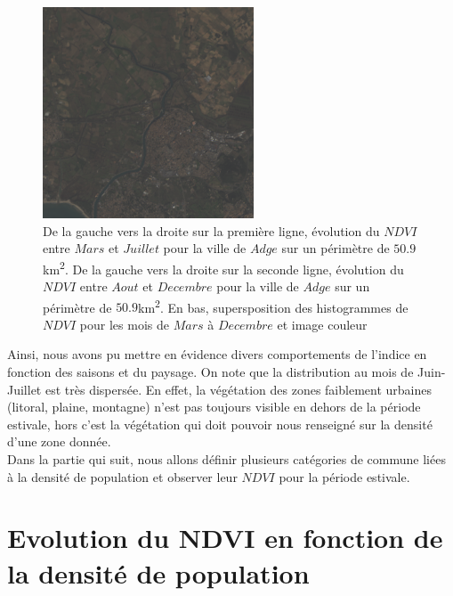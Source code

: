 \documentclass{book}
\begin{document}
\begin{figure}[H]
\begin{center}
\includegraphics[scale=0.7]{images/Agde/12_rgb.png}

\end{center}
\caption{De la gauche vers la droite sur la première ligne, évolution du $NDVI$ entre $Mars$ et $Juillet$ pour la ville de $Adge$ sur un périmètre de $50.9$km\textsuperscript{2}.
De la gauche vers la droite sur la seconde ligne, évolution du $NDVI$ entre $Aout$ et $Decembre$ pour la ville de $Adge$ sur un périmètre de $50.9$km\textsuperscript{2}. 
En bas, supersposition des histogrammes de $NDVI$ pour les mois de $Mars$ à $Decembre$ et image couleur}
\label{agde_ndvi_annee}
\end{figure}
\clearpage

Ainsi, nous avons pu mettre en évidence divers comportements de l'indice en fonction des saisons et du paysage. On note que la distribution au mois de Juin-Juillet est 
très dispersée. En effet, la végétation des zones faiblement urbaines (litoral, plaine, montagne) n'est pas toujours visible en dehors de la période estivale, hors c'est la
végétation qui doit pouvoir nous renseigné sur la densité d'une zone donnée.\\
Dans la partie qui suit, nous allons définir plusieurs catégories de commune liées à la densité de population et observer leur $NDVI$ pour la période estivale.\\

\chapter{Evolution du NDVI en fonction de la densité de population}
\end{document}
